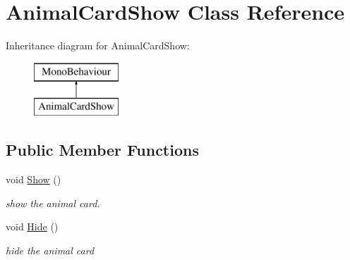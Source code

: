 \hypertarget{class_animal_card_show}{}\section{Animal\+Card\+Show Class Reference}
\label{class_animal_card_show}
Inheritance diagram for Animal\+Card\+Show\+:\begin{figure}[H]
\begin{center}
\leavevmode
\includegraphics[height=2.000000cm]{class_animal_card_show}
\end{center}
\end{figure}
\subsection*{Public Member Functions}
\begin{DoxyCompactItemize}
\item 
void \mbox{\hyperlink{class_animal_card_show_a2376232de20980281decc3e0e1745271}{Show}} ()
\begin{DoxyCompactList}\small\item\em show the animal card. \end{DoxyCompactList}\item 
void \mbox{\hyperlink{class_animal_card_show_aef559c1b5eaad01d09417ab27da22922}{Hide}} ()
\begin{DoxyCompactList}\small\item\em hide the animal card \end{DoxyCompactList}\end{DoxyCompactItemize}
